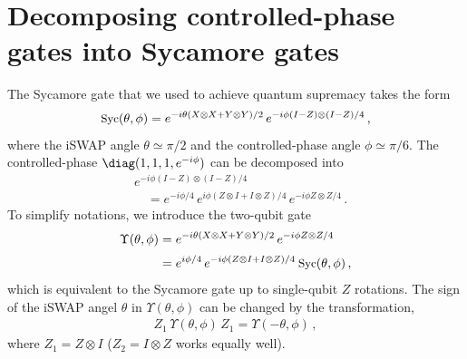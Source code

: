 \section{Decomposing controlled-phase gates into Sycamore gates}

\newcommand{\Syc}{\mbox{\small $\mathrm{Syc}$}}

The Sycamore gate that we used to achieve quantum supremacy takes the form
\begin{align}\label{cz_to_syc:eq:Sycamore_a}
    \Syc(\theta, \phi) = e^{-i\theta(X\otimes X + Y\otimes Y)/2}\, e^{-i\phi(I-Z)\otimes (I-Z)/4}\,,
\end{align}
where the iSWAP angle $\theta \simeq \pi/2$ and the controlled-phase angle $\phi \simeq \pi/6$. The controlled-phase $\diag(1,1,1, e^{-i\phi})$ can be
decomposed into
\begin{align}
&e^{-i\phi(I-Z)\otimes (I-Z)/4}\nonumber\\
&\quad = e^{-i\phi/4}\, e^{i\phi (Z\otimes I + I\otimes Z)/4}\, e^{-i\phi Z\otimes Z/4}\,.
\end{align}
To simplify notations, we introduce the two-qubit gate
\begin{align}\label{cz_to_syc:eq:Sycamore_b}
    \Upsilon(\theta, \phi)&= e^{-i\theta(X\otimes X + Y\otimes Y)/2}\, e^{-i\phi Z\otimes Z/4}\nonumber\\[2pt] 
    &= e^{i\phi/4}\, e^{-i\phi (Z\otimes I + I\otimes Z)/4}\: \Syc(\theta, \phi)
    \,,
\end{align}
which is equivalent to the Sycamore gate up to single-qubit $Z$ rotations. The sign of the iSWAP angel $\theta$ in $\Upsilon(\theta, \phi)$ can be changed by the transformation,
\begin{align}\label{cz_to_syc:eq:Sycamore_b}
  Z_1\, \Upsilon(\theta, \phi)\, Z_1  = \Upsilon(-\theta, \phi) \,,
\end{align}
where $Z_1 = Z\otimes I$ ($Z_2 = I\otimes Z$ works equally well).  

